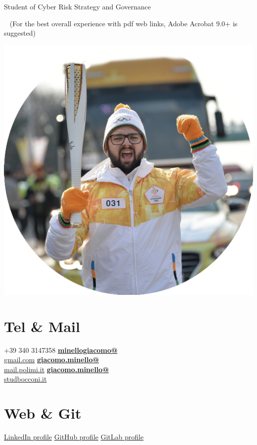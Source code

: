 \documentclass[]{friggeri-cv}
\begin{document}
       {\hspace{3,3cm} Student of Cyber Risk Strategy and Governance}
       
  
 

~
\scriptsize
{(For the best overall experience with pdf web links, Adobe Acrobat 9.0+ is suggested)} 


\normalsize
\begin{aside}
  \includegraphics[scale=0.11]{9912844.png}
  \section{Tel \& Mail}
    +39 340 3147358
    \href{mailto:minellogiacomo@gmail.com}{\textbf{minellogiacomo@}\\gmail.com}
    \href{mailto:giacomo.minello@mail.polimi.it}{\textbf{giacomo.minello@}\\mail.polimi.it}
    \href{mailto:giacomo.minello@studbocconi.it}{\textbf{giacomo.minello@}\\studbocconi.it}
    ~
\section{Web \& Git}
    \href{https://www.linkedin.com/in/giacomominello}{LinkedIn profile}
    \href{https://github.com/giacomominello}{GitHub profile} 
    \href{https://gitlab.com/users/minellogiacomo/groups}{GitLab profile}
    ~

\end{aside}
\end{document}
